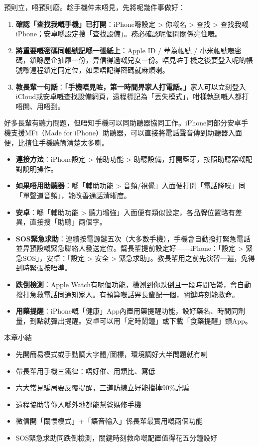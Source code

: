 
預則立，唔預則廢。趁手機仲未唔見，先將呢幾件事做好：

\begin{enumerate}
  \item \textbf{確認「查找我嘅手機」已打開}：iPhone喺設定 > 你嘅名 > 查找 > 查找我嘅iPhone；安卓喺設定搜「查找設備」。務必確認呢個開關係亮住嘅。
  \item \textbf{將重要嘅密碼同帳號記喺一張紙上}：Apple ID / 華為帳號 / 小米帳號嘅密碼，鎖喺屋企抽屜一份，畀信得過嘅兒女一份。唔見咗手機之後要登入呢啲帳號嚟遠程鎖定同定位，如果唔記得密碼就麻煩喇。
  \item \textbf{教長輩一句話}：\textbf{「手機唔見咗，第一時間畀家人打電話。」}家人可以立刻登入iCloud或安卓嘅查找設備網頁，遠程標記為「丟失模式」，咁樣執到嘅人都打唔開、用唔到。
\end{enumerate}


好多長輩有聽力問題，但唔知手機可以同助聽器協同工作。iPhone同部分安卓手機支援MFi（Made for iPhone）助聽器，可以直接將電話聲音傳到助聽器入面便，比揸住手機聽筒清楚太多喇。

\begin{itemize}
  \item \textbf{連接方法}：iPhone設定 > 輔助功能 > 助聽設備，打開藍牙，按照助聽器嘅配對說明操作。
  \item \textbf{如果唔用助聽器}：喺「輔助功能 > 音頻/視覺」入面便打開「電話降噪」同「單聲道音頻」，能改善通話清晰度。
  \item \textbf{安卓}：喺「輔助功能 > 聽力增強」入面便有類似設定，各品牌位置略有差異，直接搜「助聽」兩個字。
\end{itemize}


\begin{itemize}
  \item \textbf{SOS緊急求助}：連續按電源鍵五次（大多數手機），手機會自動撥打緊急電話並畀預設嘅緊急聯絡人發送定位。幫長輩提前設定好——iPhone：「設定 > 緊急SOS」，安卓：「設定 > 安全 > 緊急求助」。教長輩用之前先演習一遍，免得到時緊張按唔準。
  \item \textbf{跌倒檢測}：Apple Watch有呢個功能，檢測到你跌倒且一段時間唔鬱，會自動撥打急救電話同通知家人。有預算嘅話畀長輩配一個，關鍵時刻能救命。
  \item \textbf{用藥提醒}：iPhone嘅「健康」App內置用藥提醒功能，設好藥名、時間同劑量，到點就彈出提醒。安卓可以用「定時鬧鐘」或下載「食藥提醒」類App。
\end{itemize}

\begin{tcbsummary}{本章小結}
\begin{itemize}
  \item 先開簡易模式或手動調大字體/圖標，環境調好大半問題就冇喇
  \item 帶長輩用手機三鐵律：唔好催、用類比、寫低
  \item 六大常見騙局要反覆提醒，三道防線立好能擋掉90\%詐騙
  \item 遠程協助等你人喺外地都能幫爸媽修手機
  \item 微信開「關懷模式」+「語音輸入」係長輩最實用嘅兩個功能
  \item SOS緊急求助同跌倒檢測，關鍵時刻救命嘅配置值得花五分鐘設好
\end{itemize}

\end{tcbsummary}
